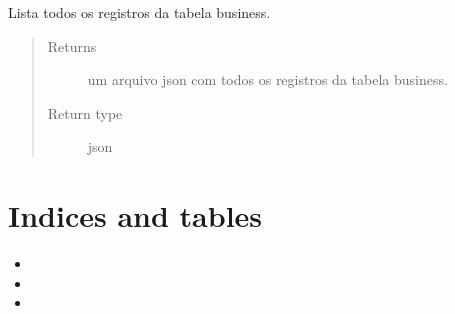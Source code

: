 \documentclass[letterpaper,10pt,english]{sphinxmanual}
\begin{document}

\begin{fulllineitems}
\label{\detokenize{index:business.list_Business}}
Lista todos os registros da tabela
business.
\begin{quote}\begin{description}
\item[{Returns}] \leavevmode
um arquivo json com todos os registros da tabela business.

\item[{Return type}] \leavevmode
json

\end{description}\end{quote}

\end{fulllineitems}



\chapter{Indices and tables}
\label{\detokenize{index:indices-and-tables}}\begin{itemize}
\item {} 

\item {} 

\item {} 

\end{itemize}
\end{document}
